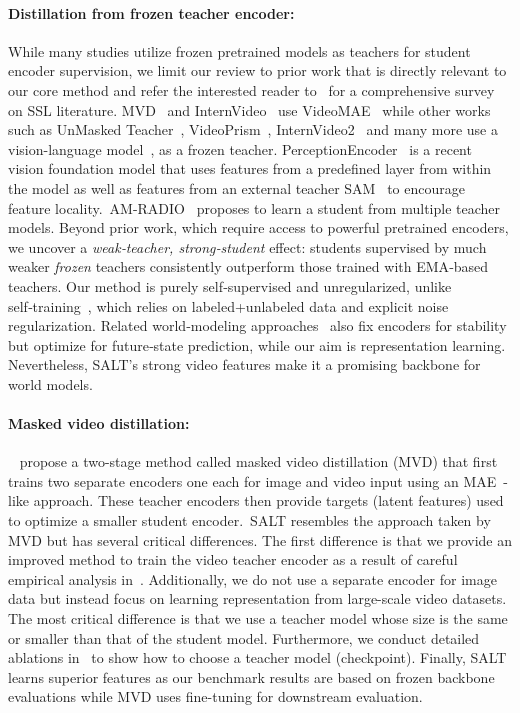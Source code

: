 \documentclass{applemlr}
\numberwithin{equation}{section}
\newcommand{\ourmethod}{SALT\xspace}
\begin{document}
\paragraph{Distillation from frozen teacher encoder: } While many studies utilize frozen pretrained models as teachers for student encoder supervision, we limit our review to prior work that is directly relevant to our core method and refer the interested reader to~\citep{balestriero2023cookbook} for a comprehensive survey on SSL literature. MVD~\citep{mvd_wang2022} and InternVideo~\citep{intervideo1_wang2022} use VideoMAE~\citep{videomaev1_tong2022} while other works such as UnMasked Teacher~\citep{umt_li2023}, VideoPrism~\citet{videoprism_zhao2024}, InternVideo2~\citet{internvideo2_wang2024} and many more use a vision-language model~\citep{clip}, as a frozen teacher. PerceptionEncoder~\citep{perception_encoder_bolya2025} is a recent vision foundation model that uses features from a predefined layer from within the model as well as features from an external teacher SAM~\citep{sam_kirillov2023} to encourage feature locality.~AM-RADIO~\citep{radio_Ranzinger_2024_CVPR} proposes to learn a student from multiple teacher models. Beyond prior work, which require access to powerful pretrained encoders, we uncover a \emph{weak‑teacher, strong‑student} effect: students supervised by much weaker \emph{frozen} teachers consistently outperform those trained with EMA‑based teachers. Our method is purely self‑supervised and unregularized, unlike self‑training~\citet{xie2020self}, which relies on labeled+unlabeled data and explicit noise regularization. Related world‑modeling approaches~\citep{dino_back_to_features_baldassarre202, zhou2024dino} also fix encoders for stability but optimize for future‑state prediction, while our aim is representation learning. Nevertheless, \ourmethod’s strong video features make it a promising backbone for world models.

\paragraph{Masked video distillation: }~\citet{mvd_wang2022} propose a two-stage method called masked video distillation (MVD) that first trains two separate encoders one each for image and video input using an MAE~\citep{mae, videomaev1_tong2022}-like approach. These teacher encoders then provide targets (latent features) used to optimize a smaller student encoder.~\ourmethod resembles the approach taken by MVD but has several critical differences. The first difference is that we provide an improved method to train the video teacher encoder as a result of careful empirical analysis in~. Additionally, we do not use a separate encoder for image data but instead focus on learning representation from large-scale video datasets. The most critical difference is that we use a teacher model whose size is the same or smaller than that of the student model. Furthermore, we conduct detailed ablations in~ to show how to choose a teacher model (checkpoint). Finally, \ourmethod learns superior features as our benchmark results are based on frozen backbone evaluations while MVD uses fine-tuning for downstream evaluation.
\end{document}
